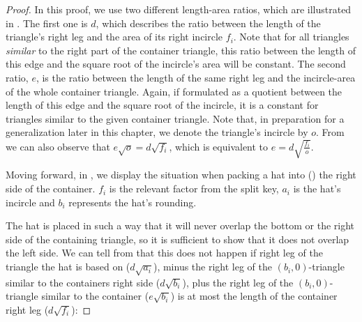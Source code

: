 \documentclass[a4paper,style=print,oneside,bibliography=totoc,nexus,lnum,extramargin]{tubsbook}
\begin{document}
\begin{proof}
    In this proof, we use two different length-area ratios, which are illustrated in . The first one is $d$, which describes the ratio between the length of the triangle's right leg and the area of its right incircle $f_i$. Note that for all triangles \emph{similar} to the right part of the container triangle, this ratio between the length of this edge and the square root of the incircle's area will be constant.
    The second ratio, $e$, is the ratio between the length of the same right leg and the incircle-area of the whole container triangle. Again, if formulated as a quotient between the length of this edge and the square root of the incircle, it is a constant for triangles similar to the given container triangle. Note that, in preparation for a generalization later in this chapter, we denote the triangle's incircle by $o$.
    From  we can also observe that
    $e\sqrt{o} = d\sqrt{f_i}$, which is equivalent to $e = d\sqrt{\frac{f_i}{o}}$.




    Moving forward, in , we display the situation when packing a hat into (\wlofg) the right side of the container. $f_i$ is the relevant factor from the split key, $a_i$ is the hat's incircle and $b_i$ represents the hat's rounding.


    The hat is placed in such a way that it will never overlap the bottom or the right side of the containing triangle, so it is sufficient to show that it does not overlap the left side.
    We can tell from  that this does not happen if right leg of the triangle the hat is based on ($d\sqrt{a_i}$), minus the right leg of the $(b_i,0)$-triangle similar to the containers right side ($d\sqrt{b_i}$), plus the right leg of the $(b_i,0)$-triangle similar to the container ($e\sqrt{b_i}$) is at most the length of the container right leg ($d\sqrt{f_i}$):


\end{proof}
\end{document}
